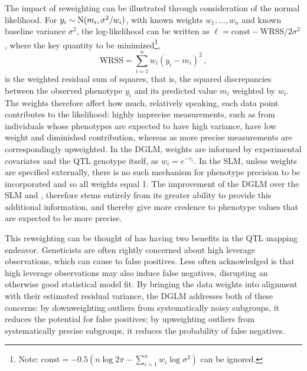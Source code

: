 The impact of reweighting can be illustrated through consideration of the normal likelihood. For $y_i\sim\mathrm{N}(m_i, \sigma^2/w_i)$, with known weights $w_1,\dots,w_n$ and known baseline variance $\sigma^2$, the log-likelihood can be written as $\ell = \text{const} - \text{WRSS}/2\sigma^2$, where
 the key quantity to be minimized\footnote{Note: $\text{const}=- 0.5(n\log2\pi -\sum^n_{i=1}w_i\log\sigma^2)$ can be ignored.}, 
\[
  \text{WRSS} = \sum^n_{i=1} w_i (y_i - m_i)^2 \,,
\]
is the weighted residual sum of squares, that is, the squared discrepancies between the observed phenotype $y_i$ and its predicted value $m_i$ weighted by $w_i$.
The weights therefore affect how much, relatively speaking, each data point contributes to the likelihood: highly imprecise measurements, such as from individuals whose phenotypes are expected to have high variance, have low weight and diminished contribution, whereas as more precise measurements are correspondingly upweighted.
In the DGLM, weights are informed by experimental covariates and the QTL genotype itself, as $w_i=e^{-v_i}$.
In the SLM, unless weights are specified externally, there is no such mechanism for phenotype precision to be incorporated and so all weights equal 1. The improvement of the DGLM over the SLM and \Caom, therefore stems entirely from its greater ability to provide this additional information, and thereby give more credence to phenotype values that are expected to be more precise.

This reweighting can be thought of has having two benefits in the QTL mapping endeavor.
Geneticists are often rightly concerned about high leverage observations, which can cause to false positives.
Less often acknowledged is that high leverage observations may also induce false negatives, disrupting an otherwise good statistical model fit.
By bringing the data weights into alignment with their estimated residual variance, the DGLM addresses both of these concerns: by downweighting outliers from systematically noisy subgroups, it reduces the potential for false positives;
by upweighting outliers from systematically precise subgroups, it reduces the probability of false negatives.





